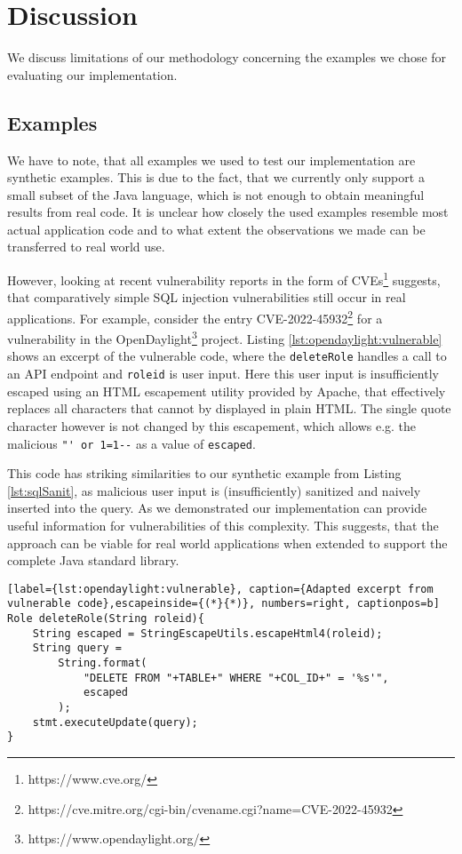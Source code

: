 \section{Discussion}

We discuss limitations of our methodology concerning the examples we chose for evaluating our implementation.

\subsection{Examples}

We have to note, that all examples we used to test our implementation are synthetic examples. This is due to the fact, that we currently only support a small subset of the Java language, which is not enough to obtain meaningful results from real code. It is unclear how closely the used examples resemble most actual application code and to what extent the observations we made can be transferred to real world use.

However, looking at recent vulnerability reports in the form of CVEs\footnote{https://www.cve.org/} suggests, that comparatively simple SQL injection vulnerabilities still occur in real applications. For example, consider the entry CVE-2022-45932\footnote{https://cve.mitre.org/cgi-bin/cvename.cgi?name=CVE-2022-45932} for a vulnerability in the OpenDaylight\footnote{https://www.opendaylight.org/} project.
Listing \ref{lst:opendaylight:vulnerable} shows an excerpt of the vulnerable code, where the \lstinline|deleteRole| handles a call to an API endpoint and \lstinline|roleid| is user input. Here this user input is insufficiently escaped using an HTML escapement utility provided by Apache, that effectively replaces all characters that cannot by displayed in plain HTML. The single quote character however is not changed by this escapement, which allows e.g. the malicious \lstinline|"' or 1=1--| as a value of \lstinline|escaped|. 

This code has striking similarities to our synthetic example from Listing \ref{lst:sqlSanit}, as malicious user input is (insufficiently) sanitized and naively inserted into the query. As we demonstrated our implementation can provide useful information for vulnerabilities of this complexity. This suggests, that the approach can be viable for real world applications when extended to support the complete Java standard library.

\begin{lstlisting}[label={lst:opendaylight:vulnerable}, caption={Adapted excerpt from vulnerable code},escapeinside={(*}{*)}, numbers=right, captionpos=b]
Role deleteRole(String roleid){
	String escaped = StringEscapeUtils.escapeHtml4(roleid);
	String query = 
		String.format(
			"DELETE FROM "+TABLE+" WHERE "+COL_ID+" = '%s'", 
			escaped
		);
	stmt.executeUpdate(query);
}       
\end{lstlisting}

